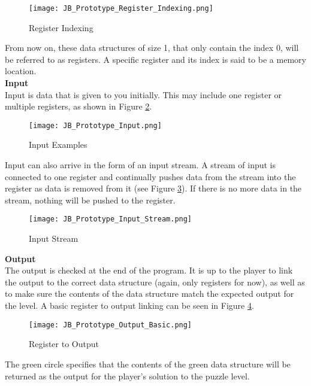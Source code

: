 \begin{figure}[!hb]
	\caption{Register Indexing}
	\label{fig:Register_Indexing}
	\centering
	\texttt{[image: JB\_Prototype\_Register\_Indexing.png]}
\end{figure}

From now on, these data structures of size 1, that only contain the index 0, will
be referred to as registers. A specific register and its index is said to be a
memory location.\\

\textbf{Input}\\
Input is data that is given to you initially. This may include one register or
multiple registers, as shown in Figure \ref{fig:Input_Example}.\\

\begin{figure}[!hb]
	\caption{Input Examples}
	\label{fig:Input_Example}
	\centering
	\texttt{[image: JB\_Prototype\_Input.png]}
\end{figure}

Input can also arrive in the form of an input stream. A stream of input is connected
to one register and continually pushes data from the stream into the register as
data is removed from it (see Figure \ref{fig:Input_Stream}). If there is no more data 
in the stream, nothing will be pushed to the register.\\

\begin{figure}[!htb]
	\caption{Input Stream}
	\label{fig:Input_Stream}
	\centering
	\texttt{[image: JB\_Prototype\_Input\_Stream.png]}
\end{figure}

\newpage
\textbf{Output}\\
The output is checked at the end of the program. It is up to the player to link
the output to the correct data structure (again, only registers for now), as well as to
make sure the contents of the data structure match the expected output for the level.
A basic register to output linking can be seen in Figure \ref{fig:Output_Basic}.\\

\begin{figure}[!hb]
	\caption{Register to Output}
	\label{fig:Output_Basic}
	\centering
	\texttt{[image: JB\_Prototype\_Output\_Basic.png]}
\end{figure}

The green circle specifies that the contents of the green data structure will be
returned as the output for the player's solution to the puzzle level.\\

